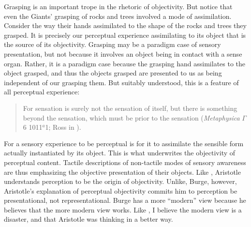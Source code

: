Grasping is an important trope in the rhetoric of objectivity. But notice that even the Giants' grasping of rocks and trees involved a mode of assimilation. Consider the way their hands assimilated to the shape of the rocks and trees they grasped. It is precisely our perceptual experience assimilating to its object that is the source of its objectivity.  Grasping may be a paradigm case of sensory presentation, but not because it involves an object being in contact with a sense organ. Rather, it is a paradigm case because the grasping hand assimilates to the object grasped, and thus the objects grasped are presented to us as being independent of our grasping them. But suitably understood, this is a feature of all perceptual experience:
\begin{quote}
	For sensation is surely not the sensation of itself, but there is something beyond the sensation, which must be prior to the sensation (\emph{Metaphysica} \( \Gamma \) 6 1011\( ^{a} \)1; Ross in \citealt[56]{Barnes:1984kx}).
\end{quote}
For a sensory experience to be perceptual is for it to assimilate the sensible form actually instantiated by its object. This is what underwrites the objectivity of perceptual content. Tactile descriptions of non-tactile modes of sensory awareness are thus emphasizing the objective presentation of their objects. Like \citet{Burge:2010uq}, Aristotle understands perception to be the origin of objectivity. Unlike, Burge, however, Aristotle's explanation of perceptual objectivity commits him to perception be presentational, not representational. Burge has a more ``modern'' view because he believes that the more modern view works. Like \citet[588--589]{Putnam:2012eu}, I believe the modern view is a disaster, and that Aristotle was thinking in a better way.

